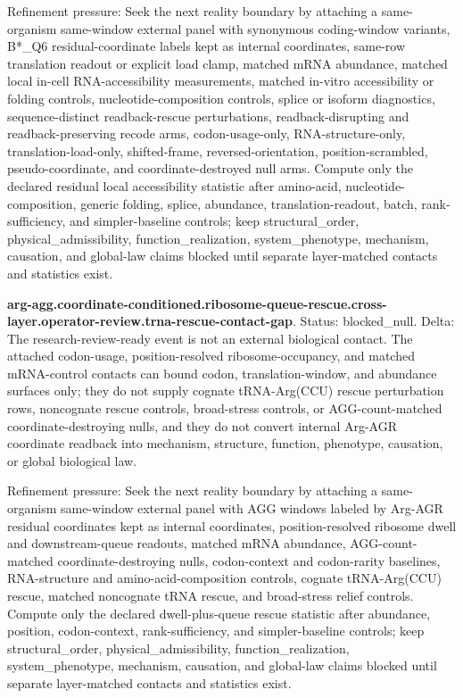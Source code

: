 Refinement pressure: Seek the next reality boundary by attaching a same-organism same-window external panel with synonymous coding-window variants, B*\_Q6 residual-coordinate labels kept as internal coordinates, same-row translation readout or explicit load clamp, matched mRNA abundance, matched local in-cell RNA-accessibility measurements, matched in-vitro accessibility or folding controls, nucleotide-composition controls, splice or isoform diagnostics, sequence-distinct readback-rescue perturbations, readback-disrupting and readback-preserving recode arms, codon-usage-only, RNA-structure-only, translation-load-only, shifted-frame, reversed-orientation, position-scrambled, pseudo-coordinate, and coordinate-destroyed null arms. Compute only the declared residual local accessibility statistic after amino-acid, nucleotide-composition, generic folding, splice, abundance, translation-readout, batch, rank-sufficiency, and simpler-baseline controls; keep structural\_order, physical\_admissibility, function\_realization, system\_phenotype, mechanism, causation, and global-law claims blocked until separate layer-matched contacts and statistics exist.

\textbf{arg-agg.coordinate-conditioned.ribosome-queue-rescue.cross-layer.operator-review.trna-rescue-contact-gap}. Status: blocked\_null. Delta: The research-review-ready event is not an external biological contact. The attached codon-usage, position-resolved ribosome-occupancy, and matched mRNA-control contacts can bound codon, translation-window, and abundance surfaces only; they do not supply cognate tRNA-Arg(CCU) rescue perturbation rows, noncognate rescue controls, broad-stress controls, or AGG-count-matched coordinate-destroying nulls, and they do not convert internal Arg-AGR coordinate readback into mechanism, structure, function, phenotype, causation, or global biological law.

Refinement pressure: Seek the next reality boundary by attaching a same-organism same-window external panel with AGG windows labeled by Arg-AGR residual coordinates kept as internal coordinates, position-resolved ribosome dwell and downstream-queue readouts, matched mRNA abundance, AGG-count-matched coordinate-destroying nulls, codon-context and codon-rarity baselines, RNA-structure and amino-acid-composition controls, cognate tRNA-Arg(CCU) rescue, matched noncognate tRNA rescue, and broad-stress relief controls. Compute only the declared dwell-plus-queue rescue statistic after abundance, position, codon-context, rank-sufficiency, and simpler-baseline controls; keep structural\_order, physical\_admissibility, function\_realization, system\_phenotype, mechanism, causation, and global-law claims blocked until separate layer-matched contacts and statistics exist.


